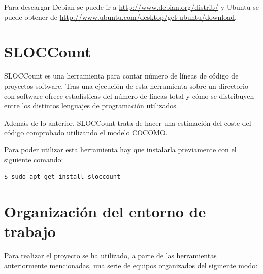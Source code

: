 Para descargar Debian se puede ir a \url{http://www.debian.org/distrib/} y Ubuntu se puede obtener de \url{http://www.ubuntu.com/desktop/get-ubuntu/download}.

\section{SLOCCount}

SLOCCount es una herramienta para contar número de líneas de código de proyectos software. Tras una ejecución de esta herramienta sobre un directorio con software ofrece estadísticas del número de líneas total y cómo se distribuyen entre los distintos lenguajes de programación utilizados.

Además de lo anterior, SLOCCount trata de hacer una estimación del coste del código comprobado utilizando el modelo COCOMO.

Para poder utilizar esta herramienta hay que instalarla previamente con el siguiente comando:

\begin{verbatim}
$ sudo apt-get install sloccount
\end{verbatim}

\section{Organización del entorno de trabajo}

Para realizar el proyecto se ha utilizado, a parte de las herramientas anteriormente mencionadas, una serie de equipos organizados del siguiente modo:

